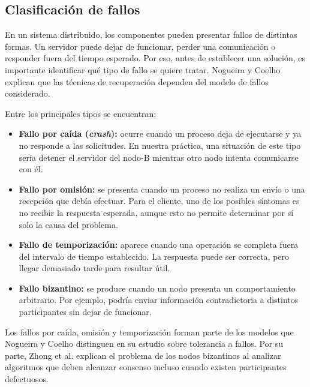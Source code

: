 
\subsection{Clasificación de fallos}

En un sistema distribuido, los componentes pueden
presentar fallos de distintas formas. Un servidor
puede dejar de funcionar, perder una comunicación
o responder fuera del tiempo esperado. Por eso,
antes de establecer una solución, es importante
identificar qué tipo de fallo se quiere tratar.
Nogueira y Coelho \cite{nogueira2026fault}
explican que las técnicas de recuperación dependen
del modelo de fallos considerado.

Entre los principales tipos se encuentran:

\begin{itemize}

    \item \textbf{Fallo por caída (\textit{crash}):}
    ocurre cuando un proceso deja de ejecutarse
    y ya no responde a las solicitudes. En nuestra
    práctica, una situación de este tipo sería
    detener el servidor del nodo-B mientras otro
    nodo intenta comunicarse con él.

    \item \textbf{Fallo por omisión:}
    se presenta cuando un proceso no realiza un
    envío o una recepción que debía efectuar.
    Para el cliente, uno de los posibles síntomas
    es no recibir la respuesta esperada, aunque
    esto no permite determinar por sí solo la
    causa del problema.

    \item \textbf{Fallo de temporización:}
    aparece cuando una operación se completa
    fuera del intervalo de tiempo establecido.
    La respuesta puede ser correcta, pero llegar
    demasiado tarde para resultar útil.

    \item \textbf{Fallo bizantino:}
    se produce cuando un nodo presenta un
    comportamiento arbitrario. Por ejemplo,
    podría enviar información contradictoria
    a distintos participantes sin dejar de
    funcionar.
\end{itemize}

Los fallos por caída, omisión y temporización
forman parte de los modelos que Nogueira y
Coelho \cite{nogueira2026fault} distinguen
en su estudio sobre tolerancia a fallos.
Por su parte, Zhong et al.
\cite{zhong2023byzantine} explican el
problema de los nodos bizantinos al
analizar algoritmos que deben alcanzar
consenso incluso cuando existen
participantes defectuosos.

